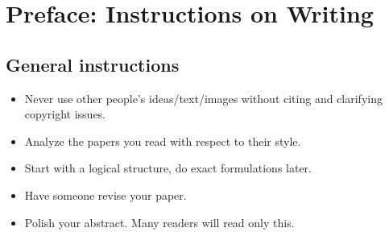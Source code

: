 \section{Preface: Instructions on Writing}

\subsection{General instructions}
\begin{itemize}
\item  Never use other people's ideas/text/images without citing and clarifying copyright issues. 

\item  Analyze the papers you read with respect to their style.	

\item  Start with a logical structure, do exact formulations later.

\item  Have someone revise your paper.

\item  Polish your abstract. Many readers will read only this.

\end{itemize}


